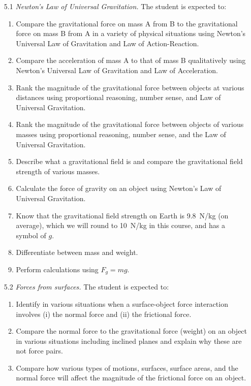 \documentclass[dvipsnames]{article}
\begin{document}
\begin{enumerate}[topsep=0pt]
    \item[5.1] \textit{Newton's Law of Universal Gravitation.} The student is expected to:
    \begin{enumerate}[topsep=0pt,itemsep=0pt]
        \item Compare the gravitational force on mass A from B to the gravitational force on mass B from A in a variety of physical situations using Newton's Universal Law of Gravitation and Law of Action-Reaction.
        \item Compare the acceleration of mass A to that of mass B qualitatively using Newton's Universal Law of Gravitation and Law of Acceleration.
        \item Rank the magnitude of the gravitational force between objects at various distances using proportional reasoning, number sense, and Law of Universal Gravitation.
        \item Rank the magnitude of the gravitational force between objects of various masses using proportional reasoning, number sense, and the Law of Universal Gravitation.
        \item Describe what a gravitational field is and compare the gravitational field strength of various masses.
        \item Calculate the force of gravity on an object using Newton's Law of Universal Gravitation.
        \item Know that the gravitational field strength on Earth is \SI{9.8}{N/kg} (on average), which we will round to \SI{10}{N/kg} in this course, and has a symbol of $g$. 
        \item Differentiate between mass and weight.
        \item Perform calculations using $F_g = mg$.
    \end{enumerate}
    \item[5.2] \textit{Forces from surfaces.} The student is expected to:
    \begin{enumerate}[topsep=0pt,itemsep=0pt]
        \item Identify in various situations when a surface-object force interaction involves (i) the normal force and (ii) the frictional force.
        \item Compare the normal force to the gravitational force (weight) on an object in various situations including inclined planes and explain why these are not force pairs.
        \item Compare how various types of motions, surfaces, surface areas, and the normal force will affect the magnitude of the frictional force on an object.

\end{enumerate}
\end{enumerate}
\end{document}
